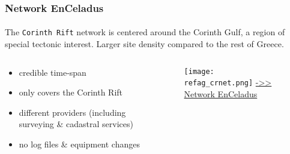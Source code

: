 \begin{frame}\frametitle{Network EnCeladus}\framesubtitle{}
\vskip-1cm
  The \texttt{Corinth Rift} network is centered around the Corinth Gulf, a 
  region of special tectonic interest. Larger site density compared to the 
  rest of Greece.
  \begin{columns}[T]
    \begin{column}{.4\textwidth}
      \begin{itemize}
        \item<pro@1-> credible time-span
        \item<pro@1-> only covers the Corinth Rift
        \item<con@1-> different providers (including surveying \& cadastral services)
        \item<con@1-> no log files \& equipment changes
      \end{itemize}
    \end{column}
    \begin{column}{.6\textwidth}
      \begin{figure}
      \begin{center}
        \texttt{[image: refag\_crnet.png]}
      \href{http://dionysos.survey.ntua.gr/dso/enceladus/}{->> Network EnCeladus}
     \label{fig:crlab}
     \end{center}
 \end{figure}
      
    \end{column}
  \end{columns}
 
%
%
%


\end{frame}


